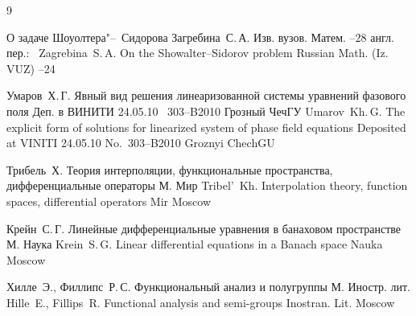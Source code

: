 \begin{thebibliography}{9}


\paper О задаче Шоуолтера"--~Сидорова
\by Загребина~С.\,А.
\jour Изв. вузов. Матем.
--28
\transl англ. пер.:~
\by Zagrebina~S.\,A.
\paper On the Showalter--Sidorov problem 
\jour Russian Math. (Iz. VUZ)
--24

\by Умаров~Х.\,Г.
\preprint Явный вид решения линеаризованной системы уравнений фазового поля
\miscnote Деп. в ВИНИТИ 24.05.10 \No~303--B2010
\publaddr Грозный
\publ ЧечГУ
\misctransl
\by Umarov~Kh.\,G.
\preprint The explicit form of solutions for linearized system of phase field equations
\miscnote Deposited at VINITI 24.05.10 No.~303--B2010
\publaddr Groznyi
\publ ChechGU


\by Трибель~Х.
\book Теория интерполяции, функциональные пространства, дифференциальные операторы
\publaddr М.
\publ Мир
\misctransl
\by Tribel'~Kh. 
\book Interpolation theory, function spaces, differential operators
\publ Mir
\publaddr Moscow


\by Крейн~С.\,Г.
\book Линейные дифференциальные уравнения в банаховом пространстве
\publaddr М.
\publ Наука
\misctransl
\by Krein~S.\,G.
\book Linear differential equations in a Banach space
\publ Nauka
\publaddr Moscow 

\pagebreak

\by Хилле~Э., Филлипс~Р.\,С.
\book Функциональный анализ и полугруппы
\publaddr М.
\publ Иностр. лит.
\misctransl
\by Hille~E., Fillips~R.
\book Functional analysis and semi-groups
\publ Inostran. Lit.
\publaddr Moscow 



\end{thebibliography}

\noindent
\hskip6.5cm \thedate \par\noindent
\hskip6.5cm\therevdate



\makeengtitlem



 \newpage
%
%
%
